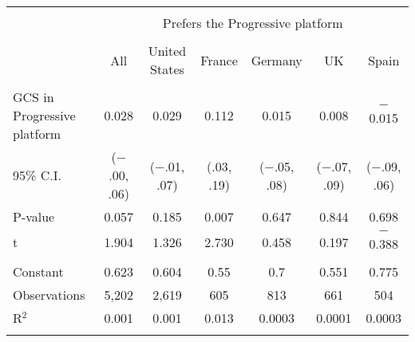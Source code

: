 
\begin{tabular}{@{\extracolsep{5pt}}lcccccc} 
\\[-1.8ex]\hline 
\hline \\[-1.8ex] 
 & \multicolumn{6}{c}{Prefers the Progressive platform} \\ 
\cline{2-7} 
\\[-1.8ex] & All & United States & France & Germany & UK & Spain \\ 
\hline \\[-1.8ex] 
 GCS in Progressive platform & 0.028 & 0.029 & 0.112 & 0.015 & 0.008 & $-$0.015 \\ 
 95\% C.I. & ($-$.00, .06) & ($-$.01, .07) & (.03, .19) & ($-$.05, .08) & ($-$.07, .09) & ($-$.09, .06) \\ 
 P-value & 0.057 & 0.185 & 0.007 & 0.647 & 0.844 & 0.698 \\ 
 t & 1.904 & 1.326 & 2.730 & 0.458 & 0.197 & $-$0.388 \\ 
 \hline \\[-1.8ex] 
Constant & 0.623 & 0.604 & 0.55 & 0.7 & 0.551 & 0.775 \\ 
Observations & 5,202 & 2,619 & 605 & 813 & 661 & 504 \\ 
R$^{2}$ & 0.001 & 0.001 & 0.013 & 0.0003 & 0.0001 & 0.0003 \\ 
\hline 
\hline \\[-1.8ex] 
\end{tabular} 